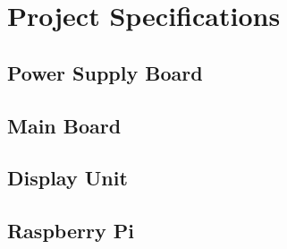 \chapter{Project Specifications}





\section{Power Supply Board}

\section{Main Board}

\section{Display Unit}

\section{Raspberry Pi}
